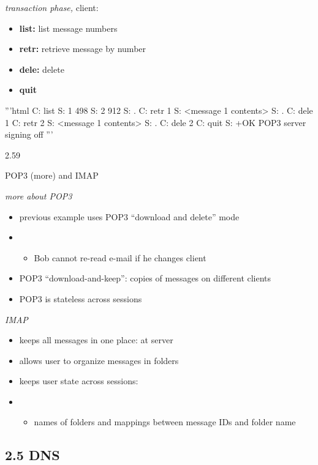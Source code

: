 \documentclass[
]{article}
\begin{document}
\emph{transaction phase,} client:

\begin{itemize}
\item
  \textbf{list:} list message numbers
\item
  \textbf{retr:} retrieve message by number
\item
  \textbf{dele:} delete
\item
  \textbf{quit}
\end{itemize}

'''html C: list S: 1 498 S: 2 912 S: . C: retr 1 S: \textless message 1
contents\textgreater{} S: . C: dele 1 C: retr 2 S: \textless message 1
contents\textgreater{} S: . C: dele 2 C: quit S: +OK POP3 server signing
off '''

2.59

POP3 (more) and IMAP

\emph{more about POP3}

\begin{itemize}
\item
  previous example uses POP3 ``download and delete'' mode
\item
  \begin{itemize}
  \item
    Bob cannot re-read e-mail if he changes client
  \end{itemize}
\item
  POP3 ``download-and-keep'': copies of messages on different clients
\item
  POP3 is stateless across sessions
\end{itemize}

\emph{IMAP}

\begin{itemize}
\item
  keeps all messages in one place: at server
\item
  allows user to organize messages in folders
\item
  keeps user state across sessions:
\item
  \begin{itemize}
  \item
    names of folders and mappings between message IDs and folder name
  \end{itemize}
\end{itemize}

\hypertarget{25-dns}{%
\subsection{2.5 DNS}\label{25-dns}}
\end{document}
